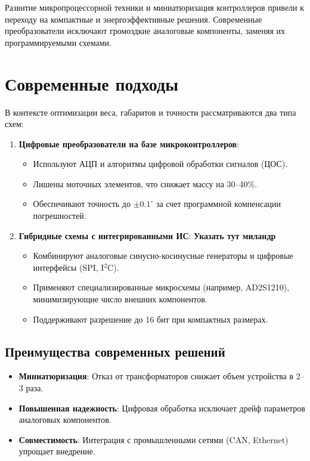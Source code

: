 Развитие микропроцессорной техники и миниатюризация контроллеров привели к переходу на компактные и энергоэффективные решения. 
Современные преобразователи исключают громоздкие аналоговые компоненты, заменяя их программируемыми схемами.

\section{Современные подходы}
В контексте оптимизации веса, габаритов и точности рассматриваются два типа схем:

\begin{enumerate}
    \item \textbf{Цифровые преобразователи на базе микроконтроллеров}:
    \begin{itemize}
        \item Используют АЦП и алгоритмы цифровой обработки сигналов (ЦОС).
        \item Лишены моточных элементов, что снижает массу на 30–40\%.
        \item Обеспечивают точность до \(\pm0.1^\circ\) за счет программной компенсации погрешностей.
    \end{itemize}
    
    \item \textbf{Гибридные схемы с интегрированными ИС}: \textbf{Указать тут миландр}
    \begin{itemize}
        \item Комбинируют аналоговые синусно-косинусные генераторы и цифровые интерфейсы (SPI, I\(^2\)C).
        \item Применяют специализированные микросхемы (например, AD2S1210), минимизирующие число внешних компонентов.
        \item Поддерживают разрешение до 16 бит при компактных размерах.
    \end{itemize}
\end{enumerate}

\subsection{Преимущества современных решений}
\begin{itemize}
    \item \textbf{Миниатюризация}: Отказ от трансформаторов снижает объем устройства в 2–3 раза.
    \item \textbf{Повышенная надежность}: Цифровая обработка исключает дрейф параметров аналоговых компонентов.
    \item \textbf{Совместимость}: Интеграция с промышленными сетями (CAN, Ethernet) упрощает внедрение.
\end{itemize}

